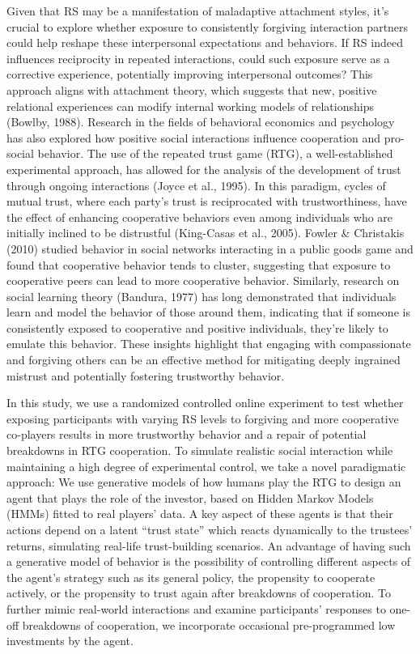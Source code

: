 \documentclass[
]{article}
\begin{document}
Given that RS may be a manifestation of maladaptive attachment styles,
it's crucial to explore whether exposure to consistently forgiving
interaction partners could help reshape these interpersonal expectations
and behaviors. If RS indeed influences reciprocity in repeated
interactions, could such exposure serve as a corrective experience,
potentially improving interpersonal outcomes? This approach aligns with
attachment theory, which suggests that new, positive relational
experiences can modify internal working models of relationships
(Bowlby, 1988). Research in the fields of behavioral economics
and psychology has also explored how positive social interactions
influence cooperation and pro-social behavior. The use of the repeated
trust game (RTG), a well-established experimental approach, has allowed
for the analysis of the development of trust through ongoing
interactions (Joyce et al., 1995). In this paradigm, cycles of mutual
trust, where each party's trust is reciprocated with trustworthiness,
have the effect of enhancing cooperative behaviors even among
individuals who are initially inclined to be distrustful
(King-Casas et al., 2005). Fowler \& Christakis (2010) studied behavior in
social networks interacting in a public goods game and found that
cooperative behavior tends to cluster, suggesting that exposure to
cooperative peers can lead to more cooperative behavior. Similarly,
research on social learning theory (Bandura, 1977) has long
demonstrated that individuals learn and model the behavior of those
around them, indicating that if someone is consistently exposed to
cooperative and positive individuals, they're likely to emulate this
behavior. These insights highlight that engaging with compassionate and
forgiving others can be an effective method for mitigating deeply
ingrained mistrust and potentially fostering trustworthy behavior.

In this study, we use a randomized controlled online experiment to test
whether exposing participants with varying RS levels to forgiving and
more cooperative co-players results in more trustworthy behavior and a
repair of potential breakdowns in RTG cooperation. To simulate realistic
social interaction while maintaining a high degree of experimental
control, we take a novel paradigmatic approach: We use generative models
of how humans play the RTG to design an agent that plays the role of the
investor, based on Hidden Markov Models (HMMs) fitted to real players'
data. A key aspect of these agents is that their actions depend on a
latent ``trust state'' which reacts dynamically to the trustees' returns,
simulating real-life trust-building scenarios. An advantage of having
such a generative model of behavior is the possibility of controlling
different aspects of the agent's strategy such as its general policy,
the propensity to cooperate actively, or the propensity to trust again
after breakdowns of cooperation. To further mimic real-world
interactions and examine participants' responses to one-off breakdowns
of cooperation, we incorporate occasional pre-programmed low investments
by the agent.
\end{document}
